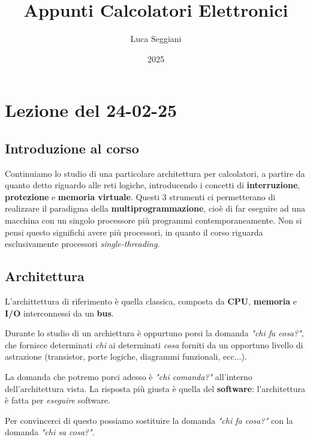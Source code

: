 \documentclass[a4paper,11pt]{article}
\title{Appunti Calcolatori Elettronici}
\author{Luca Seggiani}
\date{2025}
\begin{document}
\section{Lezione del 24-02-25}

\thispagestyle{empty}
\pagestyle{fancy}

\subsection{Introduzione al corso}
Continuiamo lo studio di una particolare architettura per calcolatori, a partire da quanto detto riguardo alle reti logiche, introducendo i concetti di \textbf{interruzione}, \textbf{protezione} e \textbf{memoria virtuale}.
Questi 3 strumenti ci permetterano di realizzare il paradigma della \textbf{multiprogrammazione}, cioè di far eseguire ad una macchina con un singolo processore più programmi contemporaneamente.
Non si pensi questo significhi avere più processori, in quanto il corso riguarda esclusivamente processori \textit{single-threading}.

\subsection{Architettura}
L'archittettura di riferimento è quella classica, composta da \textbf{CPU}, \textbf{memoria} e \textbf{I/O} interconnessi da un \textbf{bus}.

Durante lo studio di un archiettura è oppurtuno porsi la domanda \textit{"chi fa cosa?"}, che fornisce determinati \textit{chi} ai determinati \textit{cosa} forniti da un opportuno livello di astrazione (transistor, porte logiche, diagrammi funzionali, ecc...).

La domanda che potremo porci adesso è \textit{"chi comanda?"} all'interno dell'architettura vista.
La risposta più giusta è quella del \textbf{software}: l'architettura è fatta per \textit{eseguire} software.

Per convincerci di questo possiamo sostituire la domanda \textit{"chi fa cosa?"} con la domanda \textit{"chi sa cosa?"}.
\end{document}
